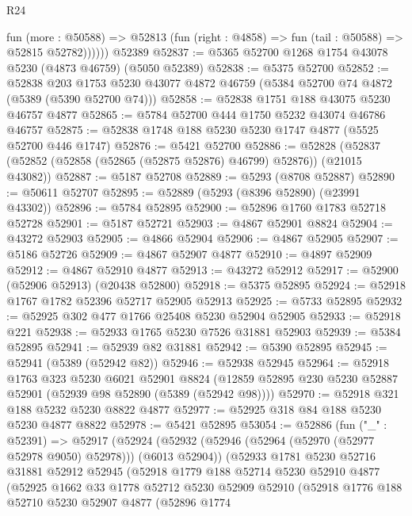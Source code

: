 \begin{lexlean}{R24}
\begin{coremodule}
            fun (more : @50588) =>
            @52813 (fun (right : @4858) => fun (tail : @50588) => @52815 @52782))))))
    @52389
@52837 := @5365 @52700 @1268 @1754 @43078 @5230 (@4873 @46759) (@5050 @52389)
@52838 := @5375 @52700
@52852 := @52838
    @203
    @1753
    @5230
    @43077
    @4872
    @46759
    (@5384 @52700 @74 @4872 (@5389 (@5390 @52700 @74)))
@52858 := @52838 @1751 @188 @43075 @5230 @46757 @4877
@52865 := @5784 @52700 @444 @1750 @5232 @43074 @46786 @46757
@52875 := @52838 @1748 @188 @5230 @5230 @1747 @4877 (@5525 @52700 @446 @1747)
@52876 := @5421 @52700
@52886 := @52828 (@52837 (@52852 (@52858 (@52865 (@52875 @52876) @46799) @52876)) (@21015 @43082))
@52887 := @5187 @52708
@52889 := @5293 (@8708 @52887)
@52890 := @50611 @52707
@52895 := @52889 (@5293 (@8396 @52890) (@23991 @43302))
@52896 := @5784 @52895
@52900 := @52896 @1760 @1783 @52718 @52728
@52901 := @5187 @52721
@52903 := @4867 @52901 @8824
@52904 := @43272 @52903
@52905 := @4866 @52904
@52906 := @4867 @52905
@52907 := @5186 @52726
@52909 := @4867 @52907 @4877
@52910 := @4897 @52909
@52912 := @4867 @52910 @4877
@52913 := @43272 @52912
@52917 := @52900 (@52906 @52913) (@20438 @52800)
@52918 := @5375 @52895
@52924 := @52918 @1767 @1782 @52396 @52717 @52905 @52913
@52925 := @5733 @52895
@52932 := @52925 @302 @477 @1766 @25408 @5230 @52904 @52905
@52933 := @52918 @221
@52938 := @52933 @1765 @5230 @7526 @31881 @52903
@52939 := @5384 @52895
@52941 := @52939 @82 @31881
@52942 := @5390 @52895
@52945 := @52941 (@5389 (@52942 @82))
@52946 := @52938 @52945
@52964 := @52918
    @1763
    @323
    @5230
    @6021
    @52901
    @8824
    (@12859 @52895 @230 @5230 @52887 @52901 (@52939 @98 @52890 (@5389 (@52942 @98))))
@52970 := @52918 @321 @188 @5232 @5230 @8822 @4877
@52977 := @52925 @318 @84 @188 @5230 @5230 @4877 @8822
@52978 := @5421 @52895
@53054 := @52886
    (fun ("_" : @52391) =>
    @52917
      (@52924
        (@52932 (@52946 (@52964 (@52970 (@52977 @52978 @9050) @52978))) (@6013 @52904))
        (@52933
          @1781
          @5230
          @52716
          @31881
          @52912
          @52945
          (@52918
            @1779
            @188
            @52714
            @5230
            @52910
            @4877
            (@52925
              @1662
              @33
              @1778
              @52712
              @5230
              @52909
              @52910
              (@52918
                @1776
                @188
                @52710
                @5230
                @52907
                @4877
                (@52896
                  @1774

\end{coremodule}
\end{lexlean}

